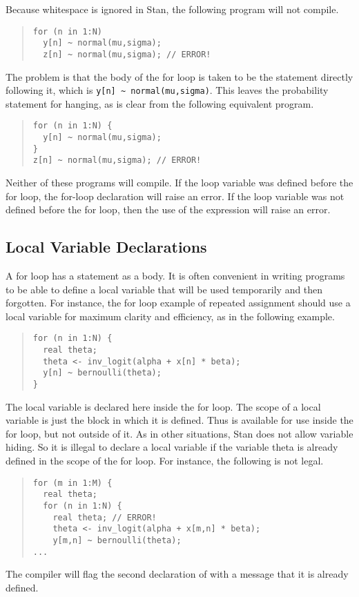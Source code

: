 Because whitespace is ignored in Stan, the following program will
not compile.
%
\begin{quote}
\begin{Verbatim}
for (n in 1:N) 
  y[n] ~ normal(mu,sigma);
  z[n] ~ normal(mu,sigma); // ERROR!
\end{Verbatim}
\end{quote}
%
The problem is that the body of the for loop is taken to be the
statement directly following it, which is 
\Verb|y[n] ~ normal(mu,sigma)|.  This leaves the probability statement for
 hanging, as is clear from the following equivalent
program.
%
\begin{quote}
\begin{Verbatim}
for (n in 1:N) {
  y[n] ~ normal(mu,sigma);
}
z[n] ~ normal(mu,sigma); // ERROR!
\end{Verbatim}
\end{quote}
%
Neither of these programs will compile. If the loop variable 
was defined before the for loop, the for-loop declaration will raise
an error.  If the loop variable  was not defined before the
for loop, then the use of the expression  will raise an
error. 

\subsection{Local Variable Declarations}

A for loop has a statement as a body.  It is often convenient in
writing programs to be able to define a local variable that will be
used temporarily and then forgotten.  For instance, the for loop
example of repeated assignment should use a local variable for maximum
clarity and efficiency, as in the following example.
%
\begin{quote}
\begin{Verbatim}
for (n in 1:N) {
  real theta;
  theta <- inv_logit(alpha + x[n] * beta);
  y[n] ~ bernoulli(theta);
}
\end{Verbatim}
\end{quote}
%
The local variable  is declared here inside the for loop.
The scope of a local variable is just the block in which it is
defined.  Thus  is available for use inside the for loop,
but not outside of it.  As in other situations, Stan does not allow
variable hiding.  So it is illegal to declare a local variable
 if the variable theta is already defined in the scope of
the for loop.  For instance, the following is not legal.
%
\begin{quote}
\begin{Verbatim}
for (m in 1:M) {
  real theta;
  for (n in 1:N) {
    real theta; // ERROR!
    theta <- inv_logit(alpha + x[m,n] * beta);
    y[m,n] ~ bernoulli(theta);
...
\end{Verbatim}
\end{quote}
%
The compiler will flag the second declaration of  with a
message that it is already defined.

